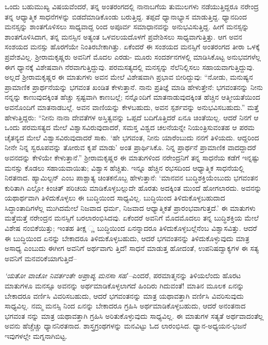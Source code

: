 ಒಂದು ಬಹುಮುಖ್ಯ ವಿಷಯವೆಂದರೆ, ತನ್ನ ಅಂತರಂಗದಲ್ಲಿ ನಾನಾಬಗೆಯ ತುಮುಲಗಳು ನಡೆಯುತ್ತಿದ್ದರೂ ನರೇಂದ್ರ ತನ್ನ ಆಧ್ಯಾತ್ಮಿಕ ಸಾಧನೆಗಳನ್ನು ಬಿಡದೆಮಾಡಿಕೊಂಡು ಬರುತ್ತಿದ್ದ. ತಪ್ಪದೆ ಧ್ಯಾನಾಭ್ಯಾಸ ಮಾಡುತ್ತಿದ್ದ. ಧ್ಯಾನದಿಂದ ಮನಸ್ಸನ್ನು ಶಾಂತಗೊಳಿಸಲು ಸಾಧ್ಯವಾದ್ದ ರಿಂದ ಅಪೂರ್ವ ಸಮಾಧಾನವನ್ನು ಅನುಭವಿಸುತ್ತಿದ್ದ. ಹೀಗೆ ಮನಸ್ಸನ್ನು ಶಾಂತಗೊಳಿಸಿದಾಗ, ತನ್ನ ಮನಸ್ಸಿನ ಅತ್ಯಂತ ಒಳವಲಯದೊಳಗೆ ಪ್ರವೇಶಿಸಲು ಸಾಧ್ಯವಾಗುತ್ತಿತ್ತು. ಆಗ ಅವನ ಸಂಶಯದ ಮನಸ್ಸು ಹೊರಗೆಯೇ ನಿಂತಿರಬೇಕಾಗಿತ್ತು. ಏಕೆಂದರೆ ಈ ಸಂಶಯದ ಮನಸ್ಸಿಗೆ ಅಂತರಂಗದ ತೀರಾ ಒಳಕ್ಕೆ ಪ್ರವೇಶವಿಲ್ಲ. ಶ್ರೀರಾಮಕೃಷ್ಣರು ಅವನಿಗೆ ಮೊದಲ ಎರಡು- ಮೂರು ಸಂದರ್ಶನಗಳಲ್ಲಿ ಮಾಡಿಸಿಕೊಟ್ಟ ಅನುಭವಗಳೆಲ್ಲ ಈಗ ಧ್ಯಾನಕ್ಕೆ ವಿಶೇಷವಾಗಿ ನೆರವಾಗುತ್ತಿದ್ದುವು. ಪರಮಸತ್ಯದಲ್ಲಿ ಮನಸ್ಸನ್ನು ನೆಲೆನಿಲ್ಲಿಸಲು ಸಹಾಯವಾಗುತ್ತಿದ್ದುವು. ಅಲ್ಲದೆ ಶ್ರೀರಾಮಕೃಷ್ಣರ ಈ ಮಾತುಗಳು ಅವನ ಮೇಲೆ ವಿಶೇಷವಾಗಿ ಪ್ರಭಾವ ಬೀರಿದ್ದುವು: “ನೋಡು, ಮನುಷ್ಯನ ಪ್ರಾಮಾಣಿಕ ಪ್ರಾರ್ಥನೆಯನ್ನು ಭಗವಂತ ಖಂಡಿತ ಕೇಳುತ್ತಾನೆ. ನಾನು ಪ್ರತಿಜ್ಞೆ ಮಾಡಿ ಹೇಳುತ್ತೇನೆ: ಭಗವಂತನನ್ನು ನೀನು ನನ್ನನ್ನು ಕಾಣುವುದಕ್ಕಿಂತ ಹೆಚ್ಚು ಸ್ಪಷ್ಟವಾಗಿ ಕಾಣಬಲ್ಲೆ; ನನ್ನೊಂದಿಗೆ ಮಾತನಾಡುವುದಕ್ಕಿಂತ ಹೆಚ್ಚಿನ ಆತ್ಮೀಯತೆಯಿಂದ ಅವನೊಂದಿಗೆ ಮಾತನಾಡಬಲ್ಲೆ. ಅವನ ವಾಣಿಯನ್ನು ಕೇಳಬಹುದು, ಅವನ ಸ್ಪರ್ಶವನ್ನು ಅನುಭವಿಸಬಹುದು.” ಮತ್ತೆ ಹೇಳುತ್ತಿದ್ದರು: “ನೀನು ನಾನಾ ದೇವತೆಗಳ ಅಸ್ತಿತ್ವವನ್ನು ಒಪ್ಪದೆ ಬದಿಗೊತ್ತಿದರೆ ಏನೂ ಚಿಂತೆಯಿಲ್ಲ. ಆದರೆ ನಿನಗೆ ಆ ಒಂದು ಪರಮಸತ್ಯದ ಮೇಲೆ ವಿಶ್ವಾಸವಿರುವುದಾದರೆ, ಸಮಸ್ತ ವಿಶ್ವದ ಚಲನೆಯನ್ನೇ ನಿಯಂತ್ರಿಸುವಂತಹ ಆ ಪರಮ ಚೈತನ್ಯದ ಮೇಲೆ ವಿಶ್ವಾಸವಿರುವುದಾದರೆ ಸಾಕು. ‘ಹೇ ಭಗವಂತ, ನೀನು ಯಾರೆಂಬುದು ನನಗೆ ತಿಳಿಯದು. ಆದ್ದರಿಂದ ನೀನೇ ನಿನ್ನ ಸ್ವರೂಪವನ್ನು ತೋರುವ ಕೃಪೆ ಮಾಡು’ ಅಂತ ಪ್ರಾರ್ಥಿಸಿಕೊ. ನಿನ್ನ ಪ್ರಾರ್ಥನೆ ಪ್ರಾಮಾಣಿಕ ವಾದದ್ದಾದರೆ ಅವನದನ್ನು ಕೇಳಿಯೇ ಕೇಳುತ್ತಾನೆ.” ಶ್ರೀರಾಮಕೃಷ್ಣರ ಈ ಮಾತುಗಳಿಂದ ನರೇಂದ್ರನಿಗೆ ತನ್ನ ಸಾಧನೆಯ ಕಡೆಗೆ ಇನ್ನಷ್ಟು ಮನಸ್ಸು ಕೊಡಲು ಸಹಾಯವಾಯಿತು; ವಿಶ್ವಾಸ ಹೆಚ್ಚಿತು. ಇನ್ನೂ ಹೆಚ್ಚಿನ ರಭಸದಿಂದ ಆಧ್ಯಾತ್ಮಿಕ ಸಾಧನೆಯಲ್ಲಿ ನಿರತನಾದ. ಹ್ಯಾಮಿಲ್ಟನ್ ಎಂಬ ಪಾಶ್ಚಾತ್ಯ ಚಿಂತಕನೊಬ್ಬ ಹೇಳುತ್ತಾನೆ: ‘ಮಾನವನ ಬುದ್ಧಿಶಕ್ತಿಯೆಂಬುದು ಭಗವಂತನ ಕುರಿತಾಗಿ ಎಲ್ಲೋ ಕಿಂಚಿತ್ ಪರಿಚಯ ಮಾಡಿಕೊಳ್ಳಬಲ್ಲುದೇ ಹೊರತು ಅದಕ್ಕಿಂತ ಮುಂದೆ ಹೋಗಲಾರದು. ಅವನನ್ನು ಯಥಾರ್ಥವಾಗಿ ತಿಳಿದುಕೊಳ್ಳಲು ಈ ಬುದ್ಧಿಯಿಂದ ಸಾಧ್ಯವಿಲ್ಲ. ಬುದ್ಧಿಯಿಂದ ತಿಳಿದುಕೊಳ್ಳಬಹುದಾದ ಸಿದ್ಧಾಂತಾದಿಗಳೆಲ್ಲ ಮುಗಿದಮೇಲೆ ನಿಜವಾದ ಧರ್ಮ, ನಿಜವಾದ ಆಧ್ಯಾತ್ಮಿಕತೆ ಪ್ರಾರಂಭವಾಗುತ್ತದೆ.’ ಈ ಮಾತುಗಳು ಮತ್ತೆಮತ್ತೆ ನರೇಂದ್ರನ ಮನಸ್ಸಿಗೆ ಬರಲಾರಂಭಿಸಿದವು. ಏಕೆಂದರೆ ಅವನಿಗೆ ಮೊದಮೊದಲು ತನ್ನ ಬುದ್ಧಿಶಕ್ತಿಯ ಮೇಲೆ ವಿಶೇಷ ನಂಬಿಕೆಯಿತ್ತು; ಇಂತಹ ತೀಕ್ಷ ್ಣ ಬುದ್ಧಿಯಿಂದ ಏನನ್ನಾದರೂ ತಿಳಿದುಕೊಳ್ಳಬಲ್ಲೆನೆಂಬ ವಿಶ್ವಾಸವಿತ್ತು. ಆದರೆ ಈ ಬುದ್ಧಿಯಿಂದ ಏನನ್ನು ಬೇಕಾದರೂ ತಿಳಿದುಕೊಳ್ಳಬಹುದು, ಆದರೆ ಭಗವಂತನನ್ನು ತಿಳಿದುಕೊಳ್ಳುವುದು ಮಾತ್ರ ಅಸಾಧ್ಯ ಎಂಬುದು ಈಗೀಗ ಅವನಿಗೆ ಅರ್ಥವಾಗು ತ್ತಿದೆ! ಸಾಧನೆ ಮಾಡುತ್ತ ಹೋದಂತೆ, ಉಪನಿಷದ್ವಾಕ್ಯಗಳ ಈ ಸತ್ಯ ಅವನಿಗೆ ಮನವರಿಕೆಯಾಗುತ್ತಿದೆ–

\textit{‘ಯತೋ ವಾಚೋ ನಿವರ್ತಂತೇ ಅಪ್ರಾಪ್ಯ ಮನಸಾ ಸಹ}’–ಎಂದರೆ, ಪರಮಾತ್ಮನನ್ನು ತಿಳಿಯಲೆಂದು ಹೊರಟ ಮಾತುಗಳೂ ಮನಸ್ಸೂ ಅವನನ್ನು ಅರ್ಥಮಾಡಿಕೊಳ್ಳಲಾಗದೆ ಹಿಂದಿರು ಗಿದುವಂತೆ! ಮಾತಿನ ಮೂಲಕ ಏನನ್ನು ಬೇಕಾದರೂ ವರ್ಣಿಸಿ ವಿವರಿಸಬಹುದು, ಆದರೆ ಭಗವಂತನನ್ನು ಮಾತ್ರ ಯಥಾವತ್ತಾಗಿ ವರ್ಣಿಸಿ ವಿವರಿಸುವುದು ಸಾಧ್ಯವಿಲ್ಲ. ನಮ್ಮ ಮನಸ್ಸಿ ನಿಂದ ಏನನ್ನು ಬೇಕಾದರೂ ಗ್ರಹಿಸಿ ಅರ್ಥಮಾಡಿಕೊಳ್ಳಬಹುದು, ಆದರೆ ಅನಂತನಾದ ಭಗವಂತ ನನ್ನು ಮಾತ್ರ ಯಥಾವತ್ತಾಗಿ ಗ್ರಹಿಸಿ ಅರಿತುಕೊಳ್ಳುವುದು ಸಾಧ್ಯವಿಲ್ಲ. ಈ ಮಾತುಗಳ ಸತ್ಯತೆ ಅರ್ಥವಾದಂತೆಲ್ಲ ಅವನು ಹೆಚ್ಚೆಚ್ಚು ಧ್ಯಾನನಿರತನಾದ. ಶಾಸ್ತ್ರಗ್ರಂಥಗಳನ್ನು ಮನವಿಟ್ಟು ಓದ ಲಾರಂಭಿಸಿದ. ಧ್ಯಾನ-ಅಧ್ಯಯನ-ಭಜನೆ ಇವುಗಳಲ್ಲೇ ಮಗ್ನನಾಗಿಬಿಟ್ಟ.

